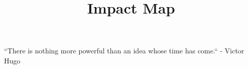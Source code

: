 \documentclass{ximera}
\title{Impact Map}
\begin{document}
\begin{abstract}

\end{abstract}
\maketitle

``There is nothing more powerful than an idea whose time has come.`` - Victor Hugo
\end{document}
